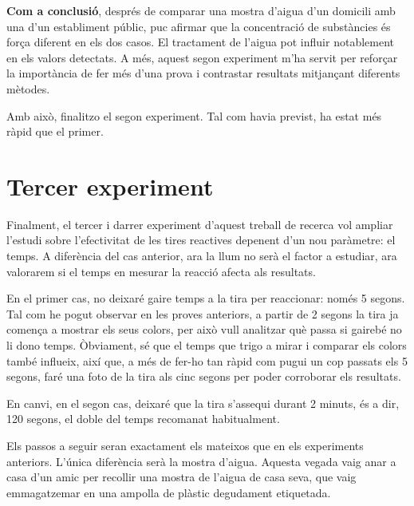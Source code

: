 \textbf{Com a conclusió}, després de comparar una mostra d’aigua d’un domicili amb una d’un establiment públic, puc afirmar que la concentració de substàncies és força diferent en els dos casos. El tractament de l’aigua pot influir notablement en els valors detectats. A més, aquest segon experiment m’ha servit per reforçar la importància de fer més d’una prova i contrastar resultats mitjançant diferents mètodes.

Amb això, finalitzo el segon experiment. Tal com havia previst, ha estat més ràpid que el primer.%
\clearpage

\section{Tercer experiment}

Finalment, el tercer i darrer experiment d’aquest treball de recerca vol ampliar l'estudi sobre l'efectivitat de les tires reactives depenent d'un nou paràmetre: el temps. A diferència del cas anterior, ara la llum no serà el factor a estudiar, ara valorarem si el temps en mesurar la reacció afecta als resultats.

En el primer cas, no deixaré gaire temps a la tira per reaccionar: només 5 segons. Tal com he pogut observar en les proves anteriors, a partir de 2 segons la tira ja comença a mostrar els seus colors, per això vull analitzar què passa si gairebé no li dono temps. Òbviament, sé que el temps que trigo a mirar i comparar els colors també influeix, així que, a més de fer-ho tan ràpid com pugui un cop passats els 5 segons, faré una foto de la tira als cinc segons per poder corroborar els resultats.

En canvi, en el segon cas, deixaré que la tira s’assequi durant 2 minuts, és a dir, 120 segons, el doble del temps recomanat habitualment.

Els passos a seguir seran exactament els mateixos que en els experiments anteriors. L’única diferència serà la mostra d’aigua. Aquesta vegada vaig anar a casa d’un amic per recollir una mostra de l’aigua de casa seva, que vaig emmagatzemar en una ampolla de plàstic degudament etiquetada.

